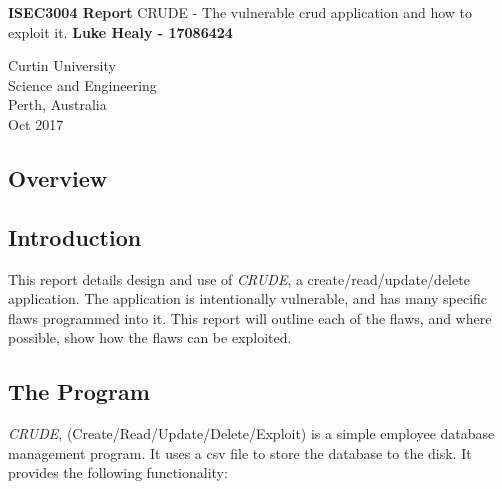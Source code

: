 \documentclass[]{article}
\begin{document}


\begin{titlepage}
	\begin{center}
		\vspace*{1cm}
		\LARGE\textbf{ISEC3004 Report} \vspace{0.5cm}
		\break
	    CRUDE - The vulnerable crud application and how to exploit it.
		\vspace{1cm}
		\break
		\Large\textbf{Luke Healy - 17086424} 
		\vspace{13cm}

		\normalsize
		Curtin University \\
		Science and Engineering \\
		Perth, Australia \\
	    Oct 2017
	    
	\end{center}
\end{titlepage}


\vspace*{-0.8cm}
\begin{center}
	\section*{Overview}
\end{center}

\vspace*{0.8cm}
\subsection*{Introduction}
This report details design and use of \textit{CRUDE}, a create/read/update/delete application. The application is intentionally vulnerable, and has many specific flaws programmed into it. This report will outline each of the flaws, and where possible, show how the flaws can be exploited.
	
\subsection*{The Program}
\textit{CRUDE}, (Create/Read/Update/Delete/Exploit) is a simple employee database management program.
It uses a csv file to store the database to the disk. It provides the following functionality:
\end{document}
